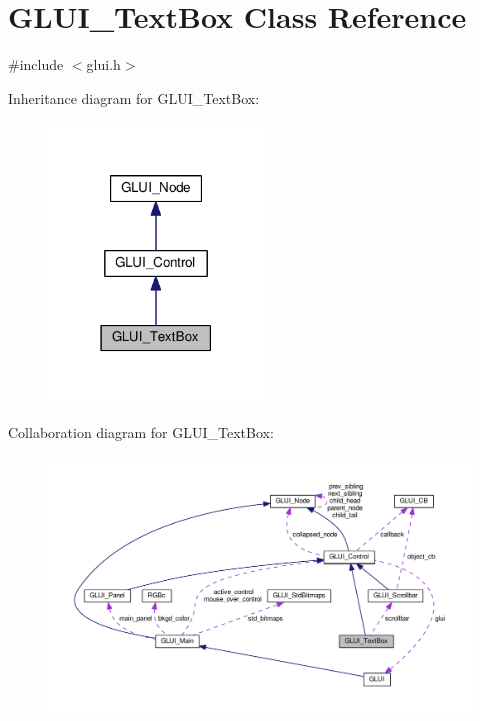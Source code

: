 \hypertarget{class_g_l_u_i___text_box}{\section{G\+L\+U\+I\+\_\+\+Text\+Box Class Reference}
\label{class_g_l_u_i___text_box}
}


{\ttfamily \#include $<$glui.\+h$>$}



Inheritance diagram for G\+L\+U\+I\+\_\+\+Text\+Box\+:\nopagebreak
\begin{figure}[H]
\begin{center}
\leavevmode
\includegraphics[width=162pt]{class_g_l_u_i___text_box__inherit__graph}
\end{center}
\end{figure}


Collaboration diagram for G\+L\+U\+I\+\_\+\+Text\+Box\+:\nopagebreak
\begin{figure}[H]
\begin{center}
\leavevmode
\includegraphics[width=350pt]{class_g_l_u_i___text_box__coll__graph}
\end{center}
\end{figure}

